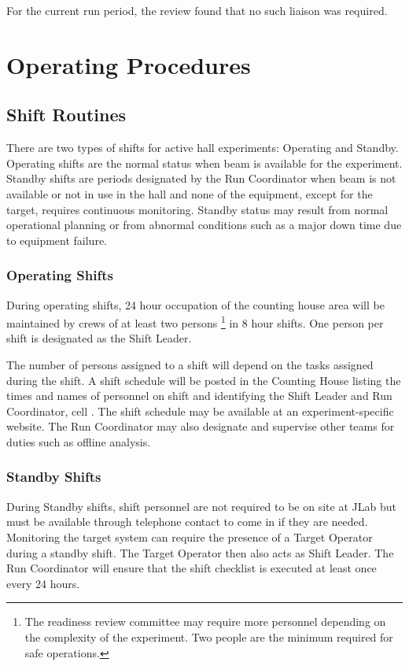 \documentclass[10pt]{article}
\begin{document}
For the current run period, the review found that no such liaison was required.


\section{Operating Procedures}

\subsection{Shift Routines}

There are two types of shifts for active hall experiments:
Operating and Standby. Operating shifts are the normal status
when beam is available for the experiment. Standby shifts are periods
designated by the Run Coordinator when beam is not available or not in
use in the hall and none of the equipment, except for the target, requires
continuous monitoring. Standby status may result from normal operational
planning or from abnormal conditions such as a major down time due to
equipment failure.


\subsubsection{Operating Shifts}

During operating shifts, 24 hour occupation of the counting house area will
be maintained by crews of at least two persons
\footnote{\label{fn2}The readiness review committee may require more
personnel depending on the complexity of the experiment. Two people are
the minimum required for safe operations.}
in 8 hour shifts. One person per shift is designated as the Shift Leader.

The number of persons assigned to a shift will depend on the tasks assigned
during the shift. A shift schedule will be posted in the Counting House
listing the times and names of personnel on shift and identifying the
Shift Leader and Run Coordinator, cell {\RCCELL}. The shift schedule may be available at
an experiment-specific website. The Run Coordinator may also designate
and supervise other teams for duties such as offline analysis.

\subsubsection{Standby Shifts}

During Standby shifts, shift personnel are not required to be on site at
JLab but must be available through telephone contact to come in if they
are needed.  Monitoring the target system can require the presence of a
Target Operator during a standby shift.  The Target Operator then also
acts as Shift Leader.  The Run Coordinator will ensure that the shift
checklist is executed at least once every 24 hours.
\end{document}
